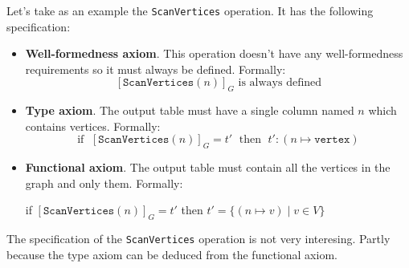 \documentclass[14pt]{constructor-thesis}
\theoremstyle{definition}
\begin{document}
Let's take as an example the \texttt{ScanVertices} operation. It has the following specification:
\begin{itemize}
  \item \textbf{Well-formedness axiom}. This operation doesn't have any well-formedness requirements so it must always be defined. Formally:
  $$ [\texttt{ScanVertices}(n)]_G \text{ is always defined} $$
  \item \textbf{Type axiom}. The output table must have a single column named $n$ which contains vertices. Formally:
  $$ \text{if } \; [\texttt{ScanVertices}(n)]_G = t' \; \text{ then } \; t' : (n \mapsto \texttt{vertex}) $$
  \item \textbf{Functional axiom}. The output table must contain all the vertices in the graph and only them. Formally:
  \begin{center}
    if $[\texttt{ScanVertices}(n)]_G = t'$ then $t' = \{(n \mapsto v) \mid v \in V\}$
  \end{center}
\end{itemize}

The specification of the \texttt{ScanVertices} operation is not very interesing. Partly because the type axiom can be deduced from the functional axiom.
\end{document}
